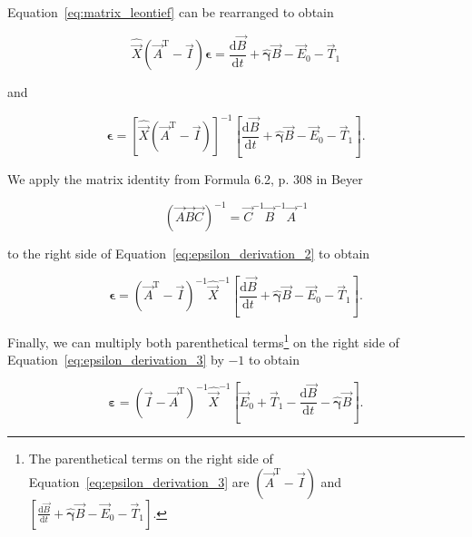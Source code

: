 Equation~\ref{eq:matrix_leontief} can be rearranged to obtain

\begin{equation} \label{eq:epsilon_derivation_1}
	\hat{\vec{X}} (\vec{A}^{\mathrm{T}} - \vec{I}) \bm{\epsilon}
	= \frac{\mathrm{d}\vec{B}}{\mathrm{d}t}
	+ \hat{\bm{\gamma}} \vec{B}
	- \vec{E}_{0}
	- \vec{T}_{1} 
\end{equation}

\noindent{}and

\begin{equation} \label{eq:epsilon_derivation_2}
	\bm{\epsilon}
	= {\left[ \hat{\vec{X}} (\vec{A}^{\mathrm{T}} - \vec{I}) \right]}^{-1}
		\left[
			\frac{\mathrm{d}\vec{B}}{\mathrm{d}t}
			+ \hat{\bm{\gamma}} \vec{B}
			- \vec{E}_{0}
			- \vec{T}_{1} 
		\right].
\end{equation}

\noindent{}We apply the matrix identity 
from Formula 6.2, p. 308 in Beyer~\cite{Beyer:1991vd}

\begin{equation} \label{eq:matrix_identity_Beyer}
	{\left(\vec{A}\vec{B}\vec{C}\right)}^{-1} 
	= \vec{C}^{-1} \vec{B}^{-1} \vec{A}^{-1}
\end{equation}

\noindent{}to the right side of Equation~\ref{eq:epsilon_derivation_2} to obtain

\begin{equation} \label{eq:epsilon_derivation_3}
	\bm{\epsilon}
	= {(\vec{A}^{\mathrm{T}} - \vec{I})}^{-1} {\hat{\vec{X}}}^{-1} 
		\left[
			\frac{\mathrm{d}\vec{B}}{\mathrm{d}t}
			+ \hat{\bm{\gamma}} \vec{B}
			- \vec{E}_{0}
			- \vec{T}_{1} 
		\right].
\end{equation}

\noindent{}Finally, we can multiply both parenthetical terms\footnote{The parenthetical
terms on the right side of Equation~\ref{eq:epsilon_derivation_3} 
are $(\vec{A}^{\mathrm{T}} - \vec{I})$ and
$
\left[
	\frac{\mathrm{d}\vec{B}}{\mathrm{d}t}
	+ \hat{\bm{\gamma}} \vec{B}
	- \vec{E}_{0}
	- \vec{T}_{1} 
\right]
$.} 
on the right side of Equation~\ref{eq:epsilon_derivation_3} by $-1$ to obtain

\begin{equation} \label{eq:epsilon_leontief_with_A}
	\bm{\varepsilon} 
	= {(\vec{I} - \vec{A}^{\mathrm{T}})}^{-1}\hat{\vec{X}}^{-1}
		\left[\vec{E}_{0} 
				+ \vec{T}_{1} 
				- \frac{\mathrm{d}\vec{B}}{\mathrm{d}t} 
				- \hat{\bm{\gamma}}\vec{B}
		\right].
\end{equation}

